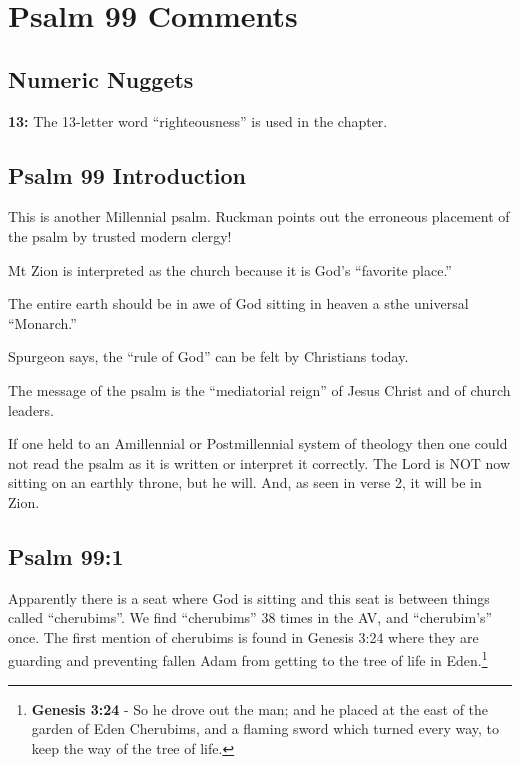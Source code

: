 \section{Psalm 99 Comments}

\subsection{Numeric Nuggets}
\textbf{13: } The 13-letter word ``righteousness'' is used in the chapter.

\subsection{Psalm 99 Introduction}
This is another Millennial psalm. Ruckman points out the erroneous placement of the psalm by trusted modern clergy!\cite{Ruckman1992PsalmsV2}
\begin{compactenum}[I.]
	\item Mt Zion is interpreted as the church because it is God's ``favorite place.''
	\item The entire earth should be in awe of God sitting in heaven a sthe universal ``Monarch.''
	\item Spurgeon says, the ``rule of God'' can be felt by Christians today.\cite{spurgeon2016treasury}
	\item The message of the psalm is the ``mediatorial reign'' of Jesus Christ and of church leaders.
\end{compactenum}
If one held to an Amillennial or Postmillennial system of theology then one could not read the psalm as it is written  or interpret it correctly. The Lord is NOT now sitting on an earthly throne, but he will. And, as seen in verse 2, it will be in Zion.

\subsection{Psalm 99:1}
Apparently there is a seat where God is sitting and this seat is between things called ``cherubims''. We find ``cherubims'' 38 times in the AV, and ``cherubim's'' once. The first mention of cherubims is found in Genesis 3:24 where they are guarding and preventing fallen Adam from getting to the tree of life in Eden.\footnote{\textbf{Genesis 3:24} - So he drove out the man; and he placed at the east of the garden of Eden Cherubims, and a flaming sword which turned every way, to keep the way of the tree of life.}

